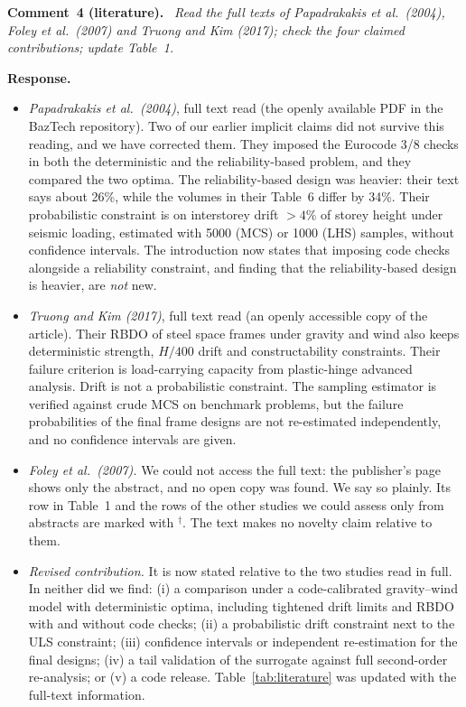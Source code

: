 \documentclass[11pt]{article}
\newenvironment{comment}[1]{\par\medskip\noindent\textbf{Comment~#1.}\ \itshape}{\par}
\newcommand{\resp}{\par\noindent\textbf{Response.}\ }
\begin{document}
\begin{comment}{4 (literature)}
Read the full texts of Papadrakakis et al.\ (2004), Foley et al.\ (2007) and Truong and Kim (2017);
check the four claimed contributions; update Table~1.
\end{comment}
\resp
\begin{itemize}[itemsep=0.1em]
\item \emph{Papadrakakis et al.\ (2004)}, full text read (the openly available PDF in the BazTech
repository). Two of our earlier implicit claims did not survive this reading, and we have corrected
them. They imposed the Eurocode 3/8 checks in both the deterministic and the reliability-based
problem, and they compared the two optima. The reliability-based design was heavier: their text
says about 26\%, while the volumes in their Table~6 differ by 34\%. Their probabilistic constraint
is on interstorey drift $>4\%$ of storey height under seismic loading, estimated with 5000 (MCS) or
1000 (LHS) samples, without confidence intervals. The introduction now states that imposing code
checks alongside a reliability constraint, and finding that the reliability-based design is
heavier, are \emph{not} new.
\item \emph{Truong and Kim (2017)}, full text read (an openly accessible copy of the article). Their
RBDO of steel space frames under gravity and wind also keeps deterministic strength, $H/400$ drift
and constructability constraints. Their failure criterion is load-carrying capacity from
plastic-hinge advanced analysis. Drift is not a probabilistic constraint. The sampling estimator is
verified against crude MCS on benchmark problems, but the failure probabilities of the final frame
designs are not re-estimated independently, and no confidence intervals are given.
\item \emph{Foley et al.\ (2007).} We could not access the full text: the publisher's page shows
only the abstract, and no open copy was found. We say so plainly. Its row in Table~1 and the rows of
the other studies we could assess only from abstracts are marked with $^\dagger$. The text makes
no novelty claim relative to them.
\item \emph{Revised contribution.} It is now stated relative to the two studies read in full. In
neither did we find: (i) a comparison under a code-calibrated gravity--wind model with deterministic
optima, including tightened drift limits and RBDO with and without code checks; (ii) a probabilistic
drift constraint next to the ULS constraint; (iii) confidence intervals or independent
re-estimation for the final designs; (iv) a tail validation of the surrogate against full
second-order re-analysis; or (v) a code release. Table~\ref{tab:literature} was updated with the
full-text information.
\end{itemize}
\end{document}
